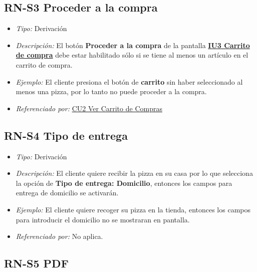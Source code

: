 	\hypertarget{RN:S3:ProcederCompra}{}
\subsection{RN-S3 Proceder a la compra}

\begin{itemize}
	
	\item \textit{Tipo:} Derivación
	
	\item \textit{Descripción:} El botón \textbf{Proceder a la compra} de la pantalla \hyperlink{IU3}{\textbf{IU3 Carrito de compra}} debe estar habilitado sólo si se tiene al menos un artículo en el carrito de compra.
	
	\item \textit{Ejemplo:} El cliente presiona el botón de \textbf{carrito} sin haber seleccionado al menos una pizza, por lo tanto no puede proceder a la compra.
	
	\item \textit{Referenciado por:} \hyperlink{CU2}{CU2 Ver Carrito de Compras}
	
\end{itemize}
	
	\hypertarget{RN:S4:TipoEntrega}{}
	\subsection{RN-S4 Tipo de entrega}
	
	\begin{itemize}
		
		\item \textit{Tipo:} Derivación
		
		\item \textit{Descripción:} El cliente quiere recibir la pizza en su casa por lo que selecciona la opción de \textbf{Tipo de entrega: Domicilio}, entonces los campos para entrega de domicilio se activarán.
		
		\item \textit{Ejemplo:} El cliente quiere recoger su pizza en la tienda, entonces los campos para introducir el domicilio no se mostraran en pantalla.
		
		\item \textit{Referenciado por:} No aplica.
		
	\end{itemize}
	
	\hypertarget{RN:S5:PDF}{}
\subsection{RN-S5 PDF}

